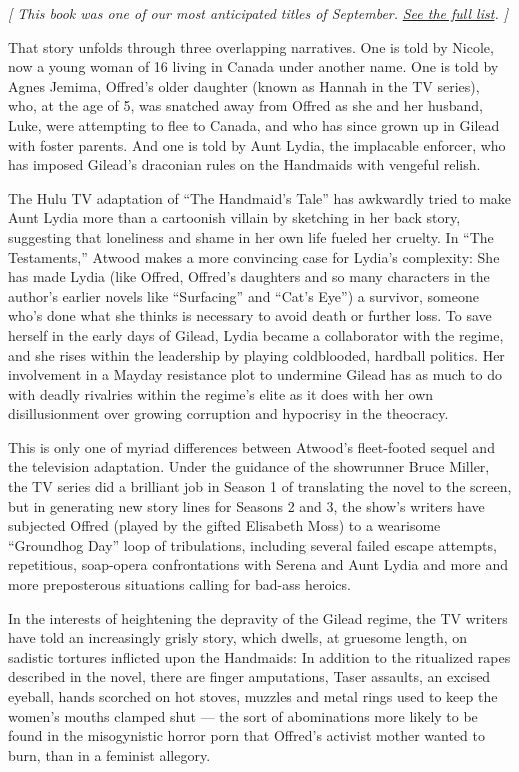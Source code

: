 \emph{{[} This book was one of our most anticipated titles of
September.}
\href{https://www.nytimes3xbfgragh.onion/2019/08/28/books/new-september-books.html}{\emph{See
the full list}}\emph{. {]}}

That story unfolds through three overlapping narratives. One is told by
Nicole, now a young woman of 16 living in Canada under another name. One
is told by Agnes Jemima, Offred's older daughter (known as Hannah in the
TV series), who, at the age of 5, was snatched away from Offred as she
and her husband, Luke, were attempting to flee to Canada, and who has
since grown up in Gilead with foster parents. And one is told by Aunt
Lydia, the implacable enforcer, who has imposed Gilead's draconian rules
on the Handmaids with vengeful relish.

The Hulu TV adaptation of ``The Handmaid's Tale'' has awkwardly tried to
make Aunt Lydia more than a cartoonish villain by sketching in her back
story, suggesting that loneliness and shame in her own life fueled her
cruelty. In ``The Testaments,'' Atwood makes a more convincing case for
Lydia's complexity: She has made Lydia (like Offred, Offred's daughters
and so many characters in the author's earlier novels like ``Surfacing''
and ``Cat's Eye'') a survivor, someone who's done what she thinks is
necessary to avoid death or further loss. To save herself in the early
days of Gilead, Lydia became a collaborator with the regime, and she
rises within the leadership by playing coldblooded, hardball politics.
Her involvement in a Mayday resistance plot to undermine Gilead has as
much to do with deadly rivalries within the regime's elite as it does
with her own disillusionment over growing corruption and hypocrisy in
the theocracy.

This is only one of myriad differences between Atwood's fleet-footed
sequel and the television adaptation. Under the guidance of the
showrunner Bruce Miller, the TV series did a brilliant job in Season 1
of translating the novel to the screen, but in generating new story
lines for Seasons 2 and 3, the show's writers have subjected Offred
(played by the gifted Elisabeth Moss) to a wearisome ``Groundhog Day''
loop of tribulations, including several failed escape attempts,
repetitious, soap-opera confrontations with Serena and Aunt Lydia and
more and more preposterous situations calling for bad-ass heroics.

In the interests of heightening the depravity of the Gilead regime, the
TV writers have told an increasingly grisly story, which dwells, at
gruesome length, on sadistic tortures inflicted upon the Handmaids: In
addition to the ritualized rapes described in the novel, there are
finger amputations, Taser assaults, an excised eyeball, hands scorched
on hot stoves, muzzles and metal rings used to keep the women's mouths
clamped shut --- the sort of abominations more likely to be found in the
misogynistic horror porn that Offred's activist mother wanted to burn,
than in a feminist allegory.

